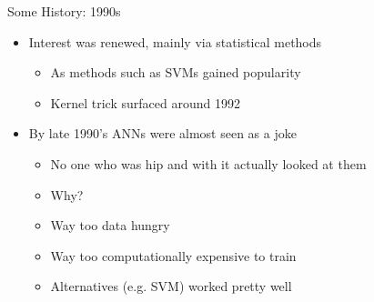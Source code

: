 \documentclass[aspectratio=169]{beamer}
\begin{document}
\begin{frame}{Some History: 1990s}

\begin{itemize}
	\item Interest was renewed, mainly via statistical methods
	\begin{itemize}
		\item As methods such as SVMs gained popularity %
		\item Kernel trick surfaced around 1992
	\end{itemize}
	\item By late 1990's ANNs were almost seen as a joke
	\begin{itemize}
		\item No one who was hip and with it actually looked at them
		\item Why?
		\item Way too data hungry
		\item Way too computationally expensive to train
		\item Alternatives (e.g. SVM) worked pretty well
	\end{itemize}
\end{itemize}
\end{frame}
\end{document}
